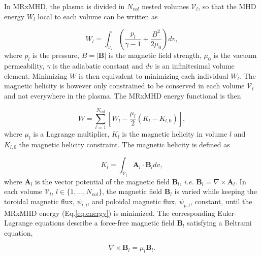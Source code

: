 \documentclass[my_thesis.tex]{subfiles}
\begin{document}
In MRxMHD, the plasma is divided in $N_{vol}$ nested volumes $\mathcal{V}_l$, so that the MHD energy $W_l$ \citep{kruskal_equilibrium_1958} local to each volume can be written as

\begin{equation}
	W_l = \int_{\mathcal{V}_l} \left(\frac{p_l}{\gamma-1}+\frac{B^2}{2\mu_0}\right)dv,
\end{equation}
where $p_l$ is the pressure, $B=|\mathbf{B}|$ is the magnetic field strength, $\mu_0$ is the vacuum permeability, $\gamma$ is the adiabatic constant and $dv$ is an infinitesimal volume element. Minimizing $W$ is then equivalent to minimizing each individual $W_l$. The magnetic helicity is however only constrained to be conserved in each volume $\mathcal{V}_l$ and not everywhere in the plasma. The \ac{MRxMHD} energy functional is then \citep{Hudson2012}

\begin{equation}
	W = \sum_{l=1}^{N_{vol}} \left[W_l -\frac{\mu_l}{2}(K_l-K_{l,0})\right], \label{eq.energy}
\end{equation}
where $\mu_l$ is a Lagrange multiplier, $K_l$ is the magnetic helicity in volume $l$ and $K_{l,0}$ the magnetic helicity constraint. The magnetic helicity is defined as 

\begin{equation}
	K_l = \int_{\mathcal{V}_l} \mathbf{A}_l\cdot \mathbf{B}_l dv,
\end{equation}
where $\mathbf{A}_l$ is the vector potential of the magnetic field  $\mathbf{B}_l$, \textit{i.e.} $\mathbf{B}_l=\nabla\times\mathbf{A}_l$. In each volume $\mathcal{V}_l$, $l\in\{1,\ldots,N_{vol}\}$, the magnetic field $\mathbf{B}_l$ is varied while keeping the toroidal magnetic flux, $\psi_{t,l}$, and poloidal magnetic flux, $\psi_{p,l}$, constant, until the \ac{MRxMHD} energy (Eq.\ref{eq.energy}) is minimized. The corresponding Euler-Lagrange equations \citep{Hudson2012} describe a force-free magnetic field $\mathbf{B}_l$ satisfying a Beltrami equation,

\begin{equation}
	\nabla\times\mathbf{B}_l = \mu_l\mathbf{B}_l.
\end{equation}
\end{document}
